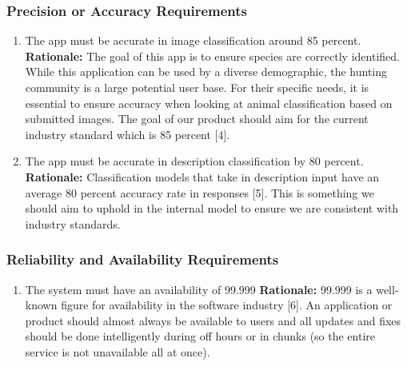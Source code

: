 \documentclass[]{article}
\begin{document}
\subsubsection{Precision or Accuracy Requirements}
\label{ssub:precision_or_accuracy_requirements}
\begin{enumerate}[{PR-PA}1. ]
	\item The app must be accurate in image classification around 85 percent.
	\newline \textbf{Rationale:} The goal of this app is to ensure species are correctly identified. While this application can be used by a diverse demographic, the hunting community is a large potential user base. For their specific needs, it is essential to ensure accuracy when looking at animal classification based on submitted images. The goal of our product should aim for the current industry standard which is 85 percent [4]. 
	\item The app must be accurate in description classification by 80 percent. 
	\newline \textbf{Rationale:} Classification models that take in description input have an average 80 percent accuracy rate in responses [5]. This is something we should aim to uphold in the internal model to ensure we are consistent with industry standards. 
\end{enumerate}

\subsubsection{Reliability and Availability Requirements}
\label{ssub:reliability_and_availability_requirements}
\begin{enumerate}[{PR-RA}1. ]
	\item The system must have an availability of 99.999
	\newline \textbf{Rationale:} 99.999 is a well-known figure for availability in the software industry [6]. An application or product should almost always be available to users and all updates and fixes should be done intelligently during off hours or in chunks (so the entire service is not unavailable all at once). 
\end{enumerate}
\end{document}
